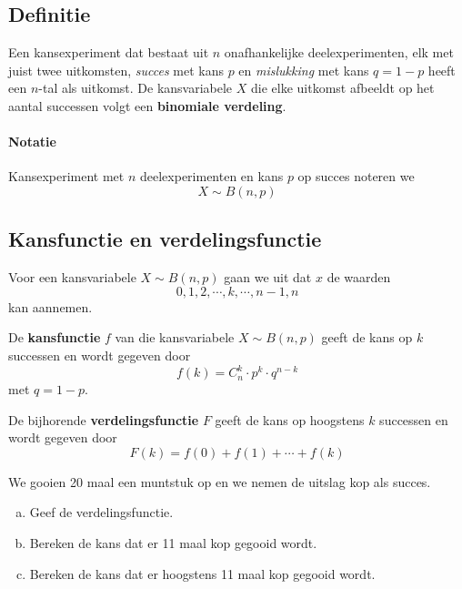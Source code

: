 \documentclass[a4paper,12pt, twoside]{article}
\begin{document}
\subsection{Definitie}

\begin{mdframed}
Een kansexperiment dat bestaat uit $n$ onafhankelijke deelexperimenten, elk met juist twee uitkomsten, {\em succes} met kans $p$ en {\em mislukking} met kans $q=1-p$ heeft een $n$-tal als uitkomst. De kansvariabele $X$ die elke uitkomst afbeeldt op het aantal successen volgt een {\bf binomiale verdeling}.
\end{mdframed}

\paragraph*{Notatie} Kansexperiment met $n$ deelexperimenten en kans $p$ op succes noteren we
$$X \sim B(n, p)$$

\subsection{Kansfunctie en verdelingsfunctie}


Voor een kansvariabele $X \sim B(n, p)$ gaan we uit dat $x$ de waarden $$0, 1, 2, \cdots, k, \cdots, n-1, n$$ kan aannemen.\\

\begin{mdframed}
De {\bf kansfunctie} $f$ van die kansvariabele $X \sim B(n, p)$ geeft de kans op $k$ successen en wordt gegeven door
$$ f(k)=C_n^k\cdot p^k\cdot q^{n-k}$$
met $q=1-p$.
\end{mdframed}
\vspace*{1cm}

\begin{mdframed}
De bijhorende {\bf verdelingsfunctie} $F$ geeft de kans op hoogstens $k$ successen en wordt gegeven door
$$ F(k)=f(0) + f(1) + \cdots + f(k)$$
\end{mdframed}

\begin{oefening}
We gooien 20 maal een muntstuk op en we nemen de uitslag kop als succes.
\begin{enumerate}[(a)]
  \item Geef de verdelingsfunctie.
  \item Bereken de kans dat er 11 maal kop gegooid wordt.
  \item Bereken de kans dat er hoogstens 11 maal kop gegooid wordt.
\end{enumerate}
\end{oefening}
\end{document}
